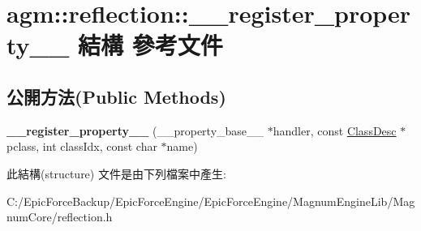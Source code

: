 \hypertarget{structagm_1_1reflection_1_1____register__property____}{}\section{agm\+:\+:reflection\+:\+:\+\_\+\+\_\+register\+\_\+property\+\_\+\+\_\+ 結構 參考文件}
\label{structagm_1_1reflection_1_1____register__property____}
\subsection*{公開方法(Public Methods)}
\begin{DoxyCompactItemize}
\item 
{\bfseries \+\_\+\+\_\+register\+\_\+property\+\_\+\+\_\+} (\+\_\+\+\_\+property\+\_\+base\+\_\+\+\_\+ $\ast$handler, const \hyperlink{classagm_1_1reflection_1_1_class_desc}{Class\+Desc} $\ast$pclass, int class\+Idx, const char $\ast$name)\hypertarget{structagm_1_1reflection_1_1____register__property_____ab4fe5a3bfffa072901bc44057e7812b3}{}\label{structagm_1_1reflection_1_1____register__property_____ab4fe5a3bfffa072901bc44057e7812b3}

\end{DoxyCompactItemize}


此結構(structure) 文件是由下列檔案中產生\+:\begin{DoxyCompactItemize}
\item 
C\+:/\+Epic\+Force\+Backup/\+Epic\+Force\+Engine/\+Epic\+Force\+Engine/\+Magnum\+Engine\+Lib/\+Magnum\+Core/reflection.\+h\end{DoxyCompactItemize}
